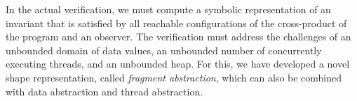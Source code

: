 In the actual verification, we must compute a symbolic representation
of an invariant that is satisfied by all reachable configurations of
the cross-product of the program  and an observer.
The verification must address the challenges of an unbounded domain of
data values, an unbounded number of concurrently executing threads, and an
unbounded heap.
For this, we have developed a novel shape representation, called
{\em fragment abstraction}, which can also be combined with
data abstraction and thread abstraction.
